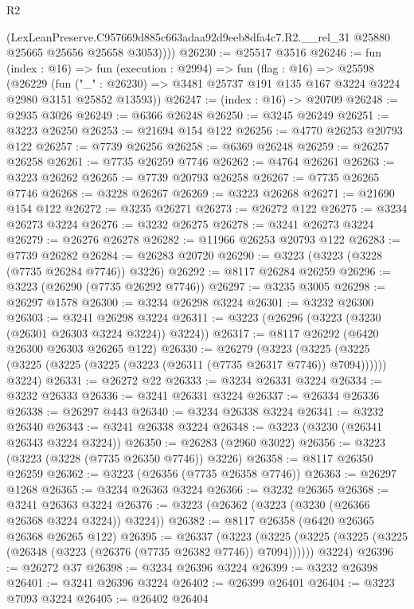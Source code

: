 \begin{lexlean}{R2}
\begin{coremodule}
          (LexLeanPreserve.C957669d885c663adaa92d9eeb8dfa4c7.R2.__rel_31
            @25880
            @25665
            @25656
            @25658
            @3053))))
@26230 := @25517 @3516
@26246 := fun (index : @16) =>
  fun (execution : @2994) =>
  fun (flag : @16) =>
  @25598
    (@26229
      (fun ("_" : @26230) => @3481 @25737 @191 @135 @167 @3224 @3224 @2980 @3151 @25852 @13593))
@26247 := (index : @16) -> @20709
@26248 := @2935 @3026
@26249 := @6366 @26248
@26250 := @3245 @26249
@26251 := @3223 @26250
@26253 := @21694 @154 @122
@26256 := @4770 @26253 @20793 @122
@26257 := @7739 @26256
@26258 := @6369 @26248
@26259 := @26257 @26258
@26261 := @7735 @26259 @7746
@26262 := @4764 @26261
@26263 := @3223 @26262
@26265 := @7739 @20793 @26258
@26267 := @7735 @26265 @7746
@26268 := @3228 @26267
@26269 := @3223 @26268
@26271 := @21690 @154 @122
@26272 := @3235 @26271
@26273 := @26272 @122
@26275 := @3234 @26273 @3224
@26276 := @3232 @26275
@26278 := @3241 @26273 @3224
@26279 := @26276 @26278
@26282 := @11966 @26253 @20793 @122
@26283 := @7739 @26282
@26284 := @26283 @20720
@26290 := @3223 (@3223 (@3228 (@7735 @26284 @7746)) @3226)
@26292 := @8117 @26284 @26259
@26296 := @3223 (@26290 (@7735 @26292 @7746))
@26297 := @3235 @3005
@26298 := @26297 @1578
@26300 := @3234 @26298 @3224
@26301 := @3232 @26300
@26303 := @3241 @26298 @3224
@26311 := @3223 (@26296 (@3223 (@3230 (@26301 @26303 @3224 @3224)) @3224))
@26317 := @8117 @26292 (@6420 @26300 @26303 @26265 @122)
@26330 := @26279
    (@3223
      (@3225 (@3225 (@3225 (@3225 (@3225 (@3223 (@26311 (@7735 @26317 @7746)) @7094))))))
      @3224)
@26331 := @26272 @22
@26333 := @3234 @26331 @3224
@26334 := @3232 @26333
@26336 := @3241 @26331 @3224
@26337 := @26334 @26336
@26338 := @26297 @443
@26340 := @3234 @26338 @3224
@26341 := @3232 @26340
@26343 := @3241 @26338 @3224
@26348 := @3223 (@3230 (@26341 @26343 @3224 @3224))
@26350 := @26283 (@2960 @3022)
@26356 := @3223 (@3223 (@3228 (@7735 @26350 @7746)) @3226)
@26358 := @8117 @26350 @26259
@26362 := @3223 (@26356 (@7735 @26358 @7746))
@26363 := @26297 @1268
@26365 := @3234 @26363 @3224
@26366 := @3232 @26365
@26368 := @3241 @26363 @3224
@26376 := @3223 (@26362 (@3223 (@3230 (@26366 @26368 @3224 @3224)) @3224))
@26382 := @8117 @26358 (@6420 @26365 @26368 @26265 @122)
@26395 := @26337
    (@3223
      (@3225 (@3225 (@3225 (@3225 (@26348 (@3223 (@26376 (@7735 @26382 @7746)) @7094))))))
      @3224)
@26396 := @26272 @37
@26398 := @3234 @26396 @3224
@26399 := @3232 @26398
@26401 := @3241 @26396 @3224
@26402 := @26399 @26401
@26404 := @3223 @7093 @3224
@26405 := @26402 @26404

\end{coremodule}
\end{lexlean}
